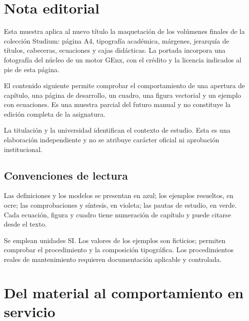 
\chapter*{Nota editorial}
Esta muestra aplica al nuevo título la maquetación de los volúmenes finales de la colección Studium: página A4, tipografía académica, márgenes, jerarquía de títulos, cabeceras, ecuaciones y cajas didácticas. La portada incorpora una fotografía del núcleo de un motor GEnx, con el crédito y la licencia indicados al pie de esta página.

El contenido siguiente permite comprobar el comportamiento de una apertura de capítulo, una página de desarrollo, un cuadro, una figura vectorial y un ejemplo con ecuaciones. Es una muestra parcial del futuro manual y no constituye la edición completa de la asignatura.


La titulación y la universidad identifican el contexto de estudio. Esta es una elaboración independiente y no se atribuye carácter oficial ni aprobación institucional.

\section*{Convenciones de lectura}
Las definiciones y los modelos se presentan en azul; los ejemplos resueltos, en ocre; las comprobaciones y síntesis, en violeta; las pautas de estudio, en verde. Cada ecuación, figura y cuadro tiene numeración de capítulo y puede citarse desde el texto.

Se emplean unidades SI. Los valores de los ejemplos son ficticios; permiten comprobar el procedimiento y la composición tipográfica. Los procedimientos reales de mantenimiento requieren documentación aplicable y controlada.

\par\vfill\creditosportada
\tableofcontents
\mainmatter
\chapter{Del material al comportamiento en servicio}
\label{ch:material}


